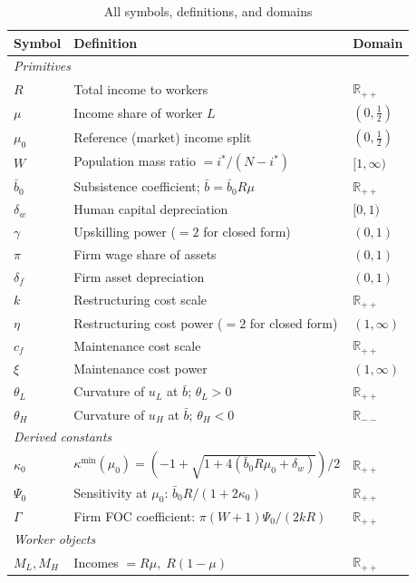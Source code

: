 \documentclass[12pt,a4paper]{article}
\begin{document}
\begin{table}[h!]
\centering
\caption{All symbols, definitions, and domains}
\label{tab:notation}
\renewcommand{\arraystretch}{1.15}
\begin{tabular}{lp{8.2cm}l}
\toprule
Symbol & Definition & Domain \\
\midrule
\multicolumn{3}{l}{\textit{Primitives}} \\
$R$ & Total income to workers & $\mathbb{R}_{++}$ \\
$\mu$ & Income share of worker $L$ & $(0,\tfrac{1}{2})$ \\
$\mu_0$ & Reference (market) income split & $(0,\tfrac{1}{2})$ \\
$W$ & Population mass ratio $= i^*/(N-i^*)$ & $[1,\infty)$ \\
$\bar{b}_0$ & Subsistence coefficient; $\bar{b}=\bar{b}_0 R\mu$ & $\mathbb{R}_{++}$ \\
$\delta_w$ & Human capital depreciation & $[0,1)$ \\
$\gamma$ & Upskilling power ($=2$ for closed form) & $(0,1)$ \\
$\pi$ & Firm wage share of assets & $(0,1)$ \\
$\delta_f$ & Firm asset depreciation & $(0,1)$ \\
$k$ & Restructuring cost scale & $\mathbb{R}_{++}$ \\
$\eta$ & Restructuring cost power ($=2$ for closed form) & $(1,\infty)$ \\
$c_f$ & Maintenance cost scale & $\mathbb{R}_{++}$ \\
$\xi$ & Maintenance cost power & $(1,\infty)$ \\
$\theta_L$ & Curvature of $u_L$ at $\bar{b}$; $\theta_L > 0$ & $\mathbb{R}_{++}$ \\
$\theta_H$ & Curvature of $u_H$ at $\bar{b}$; $\theta_H < 0$ & $\mathbb{R}_{--}$ \\
\midrule
\multicolumn{3}{l}{\textit{Derived constants}} \\
$\kappa_0$ & $\kappa^{\min}(\mu_0)=(-1+\sqrt{1+4(\bar{b}_0R\mu_0+\delta_w)})/2$ & $\mathbb{R}_{++}$ \\
$\Psi_0$ & Sensitivity at $\mu_0$: $\bar{b}_0R/(1+2\kappa_0)$ & $\mathbb{R}_{++}$ \\
$\Gamma$ & Firm FOC coefficient: $\pi(W+1)\Psi_0/(2kR)$ & $\mathbb{R}_{++}$ \\
\midrule
\multicolumn{3}{l}{\textit{Worker objects}} \\
$M_L,M_H$ & Incomes $=R\mu,\;R(1-\mu)$ & $\mathbb{R}_{++}$ \\

\end{tabular}
\end{table}
\end{document}
